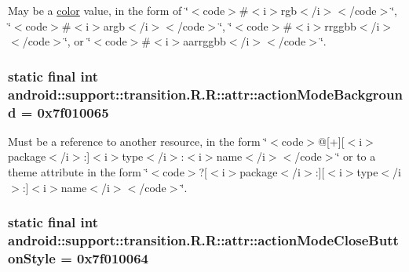 May be a \hyperlink{classandroid_1_1support_1_1transition_1_1_r_1_1color}{color} value, in the form of \char`\"{}$<$code$>$\#$<$i$>$rgb$<$/i$>$$<$/code$>$\char`\"{}, \char`\"{}$<$code$>$\#$<$i$>$argb$<$/i$>$$<$/code$>$\char`\"{}, \char`\"{}$<$code$>$\#$<$i$>$rrggbb$<$/i$>$$<$/code$>$\char`\"{}, or \char`\"{}$<$code$>$\#$<$i$>$aarrggbb$<$/i$>$$<$/code$>$\char`\"{}. \hypertarget{classandroid_1_1support_1_1transition_1_1_r_1_1attr_ad0212327b498cdb123cee5d43b69bf7}{
\subsubsection[{actionModeBackground}]{\setlength{\rightskip}{0pt plus 5cm}static final int android::support::transition.R.R::attr::actionModeBackground = 0x7f010065}}
\label{classandroid_1_1support_1_1transition_1_1_r_1_1attr_ad0212327b498cdb123cee5d43b69bf7}


Must be a reference to another resource, in the form \char`\"{}$<$code$>$@\mbox{[}+\mbox{]}\mbox{[}$<$i$>$package$<$/i$>$:\mbox{]}$<$i$>$type$<$/i$>$:$<$i$>$name$<$/i$>$$<$/code$>$\char`\"{} or to a theme attribute in the form \char`\"{}$<$code$>$?\mbox{[}$<$i$>$package$<$/i$>$:\mbox{]}\mbox{[}$<$i$>$type$<$/i$>$:\mbox{]}$<$i$>$name$<$/i$>$$<$/code$>$\char`\"{}. \hypertarget{classandroid_1_1support_1_1transition_1_1_r_1_1attr_b8c79961f8038b23f97fb8c1ae3a3f4f}{
\subsubsection[{actionModeCloseButtonStyle}]{\setlength{\rightskip}{0pt plus 5cm}static final int android::support::transition.R.R::attr::actionModeCloseButtonStyle = 0x7f010064}}
\label{classandroid_1_1support_1_1transition_1_1_r_1_1attr_b8c79961f8038b23f97fb8c1ae3a3f4f}


